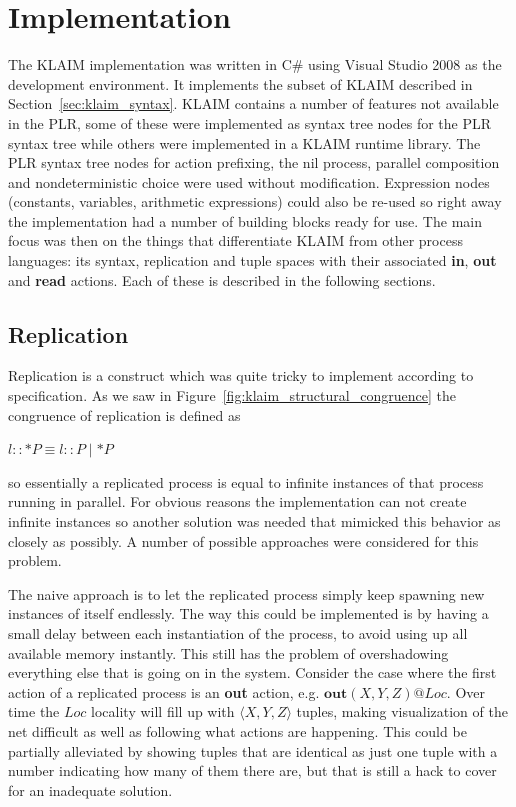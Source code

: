 \section{Implementation}
	The KLAIM implementation was written in C\# using Visual Studio 2008 as the 
	development environment. It implements the subset of KLAIM described in  
	Section~\ref{sec:klaim_syntax}. KLAIM contains a number of features not 
	available in the PLR, some of these were implemented as syntax tree nodes 
	for the PLR syntax tree while others were implemented in a KLAIM runtime 
	library. The PLR syntax tree nodes for action prefixing, the nil process, 
	parallel composition and nondeterministic choice were used without 
	modification. Expression nodes (constants, variables, arithmetic 
	expressions) could also be re-used so right away the implementation had a 
	number of building blocks ready for use. The main focus was then on the 
	things that differentiate KLAIM from other process languages: its syntax, 
	replication and tuple spaces with their associated \textbf{in}, \textbf{out} 
	and \textbf{read} actions. Each of these is described in the following 
	sections.
	
\subsection{Replication}
	
	Replication is a construct which was quite tricky to implement 
	according to specification. As we saw in 
	Figure~\ref{fig:klaim_structural_congruence} the congruence of replication 
	is defined as
	\begin{center}$l::*P \equiv l::P \mid *P$\end{center}
	so essentially a replicated process is equal to infinite instances of that 
	process running in parallel. For obvious reasons the implementation can not 
	create infinite instances so another solution was needed that mimicked this 
	behavior as closely as possibly. A number of possible approaches were 
	considered for this problem.
	
	The naive approach is to let the replicated process simply keep
	spawning new instances of itself endlessly. The way this could be 
	implemented is by having a small delay between each instantiation of
	the process, to avoid using up all available memory instantly. This
	still has the problem of overshadowing everything else that is going
	on in the system. Consider the case where the first action of a 
	replicated process is an \textbf{out} action, e.g. 
	$\mathbf{out}(X,Y,Z)@Loc$. Over time the $Loc$ locality will fill up
	with $\langle X,Y,Z \rangle$ tuples, making visualization of the net 
	difficult as well as following what actions are happening. This could be 
	partially alleviated by showing tuples that are identical as just one tuple 
	with a number indicating how many of them there are, but that is still a
	hack to cover for an inadequate solution.
		
